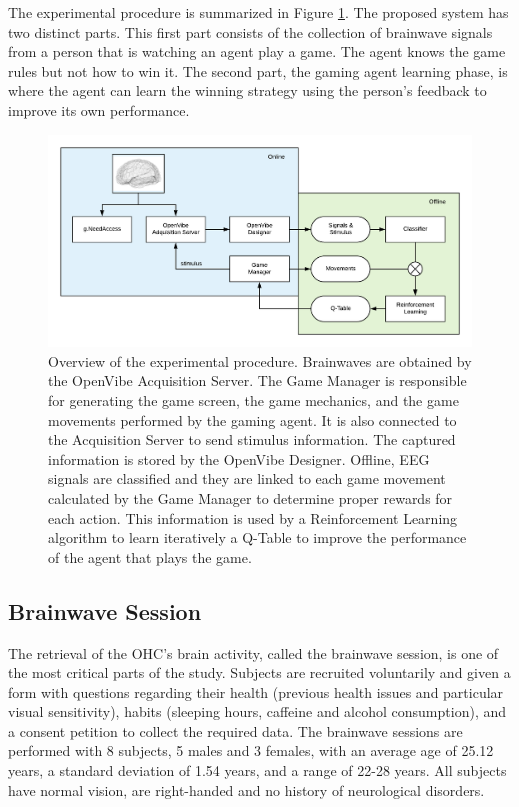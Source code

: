 \documentclass[journal]{IEEEtran}
\begin{document}
The experimental procedure is summarized in Figure \ref{diag:complete_flow}. The proposed system has two distinct parts. This first part consists of the collection of brainwave signals from a person that is watching an agent play a game.  The agent knows the game rules but not how to win it. The second part, the gaming agent learning phase, is where the agent can learn the winning strategy using the person's feedback to improve its own performance.

\begin{figure}
    \centering
    \includegraphics[width=\textwidth]{Images/complete_flow.png}
    \caption{Overview of the experimental procedure. Brainwaves are obtained by the OpenVibe Acquisition Server.  The Game Manager is responsible for generating the game screen, the game mechanics, and the game movements performed by the gaming agent.  It is also connected to the Acquisition Server to send stimulus information.  The captured information is stored by the OpenVibe Designer.  Offline, EEG signals are classified and they are linked to each game movement calculated by the Game Manager to determine proper rewards for each action.  This information is used by a Reinforcement Learning algorithm to learn iteratively a Q-Table to improve the performance of the agent that plays the game.}
    \label{diag:complete_flow}
\end{figure}

\subsection{Brainwave Session}
\label{brainwavesession}

The retrieval of the OHC's brain activity, called the brainwave session, is one of the most critical parts of the study.  Subjects are recruited voluntarily and given a form with questions regarding their health (previous health issues and particular visual sensitivity), habits (sleeping hours, caffeine and alcohol consumption), and a consent petition to collect the required data. The brainwave sessions are performed with 8 subjects, 5 males and 3 females, with an average age of 25.12 years, a standard deviation of 1.54 years, and a range of 22-28 years. All subjects have normal vision, are right-handed and no history of neurological disorders.
\end{document}
